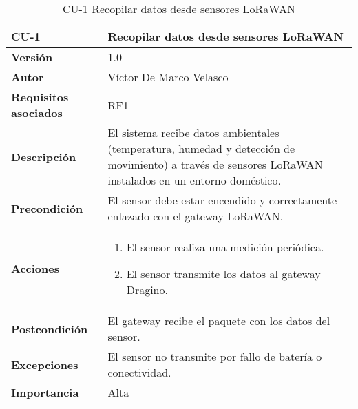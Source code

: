 \begin{table}[p]
	\centering
	\begin{tabularx}{\linewidth}{ p{} p{} }
		\toprule
		\textbf{CU-1}    & Recopilar datos desde sensores LoRaWAN \\
		\toprule
		\textbf{Versión}              & 1.0 \\
		\textbf{Autor}                & Víctor De Marco Velasco \\
		\textbf{Requisitos asociados} & RF1 \\
		\textbf{Descripción}          & El sistema recibe datos ambientales (temperatura, humedad y detección de movimiento) a través de sensores LoRaWAN instalados en un entorno doméstico. \\
		\textbf{Precondición}         & El sensor debe estar encendido y correctamente enlazado con el gateway LoRaWAN. \\
		\textbf{Acciones}             &
		\begin{enumerate}
			\item El sensor realiza una medición periódica.
			\item El sensor transmite los datos al gateway Dragino.
		\end{enumerate}\\
		\textbf{Postcondición}        & El gateway recibe el paquete con los datos del sensor. \\
		\textbf{Excepciones}          & El sensor no transmite por fallo de batería o conectividad. \\
		\textbf{Importancia}          & Alta \\
		\bottomrule
	\end{tabularx}
	\caption{CU-1 Recopilar datos desde sensores LoRaWAN}
\end{table}
